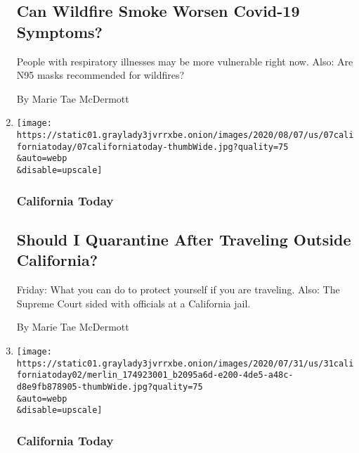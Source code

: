 \begin{enumerate}
  \hypertarget{can-wildfire-smoke-worsen-covid-19-symptoms}{%
  \subsection{Can Wildfire Smoke Worsen Covid-19
  Symptoms?}\label{can-wildfire-smoke-worsen-covid-19-symptoms}}

  People with respiratory illnesses may be more vulnerable right now.
  Also: Are N95 masks recommended for wildfires?

  By Marie Tae McDermott
\item
  \href{/2020/08/07/us/california-travel-restrictions-covid-19.html}{}

  \texttt{[image: https://static01.graylady3jvrrxbe.onion/images/2020/08/07/us/07californiatoday/07californiatoday-thumbWide.jpg?quality=75\\\&auto=webp\\\&disable=upscale]}

  \hypertarget{california-today-4}{%
  \subsubsection{California Today}\label{california-today-4}}

  \hypertarget{should-i-quarantine-after-traveling-outside-california}{%
  \subsection{Should I Quarantine After Traveling Outside
  California?}\label{should-i-quarantine-after-traveling-outside-california}}

  Friday: What you can do to protect yourself if you are traveling.
  Also: The Supreme Court sided with officials at a California jail.

  By Marie Tae McDermott
\item
  \href{/2020/07/31/us/essential-workers-massage-therapists.html}{}

  \texttt{[image: https://static01.graylady3jvrrxbe.onion/images/2020/07/31/us/31californiatoday02/merlin\_174923001\_b2095a6d-e200-4de5-a48c-d8e9fb878905-thumbWide.jpg?quality=75\\\&auto=webp\\\&disable=upscale]}

  \hypertarget{california-today-5}{%
  \subsubsection{California Today}\label{california-today-5}}

  \hypertarget{how-massage-therapists-in-california-are-adapting-to-the-pandemic}{%
}
\end{enumerate}
